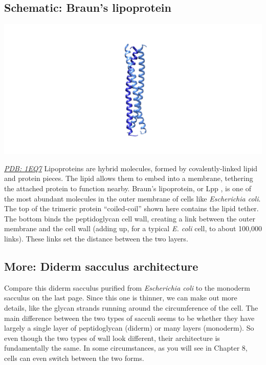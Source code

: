\documentclass[]{tufte-book}
\begin{document}
\hypertarget{Brauns_lipoprotein}{\subsection*{Schematic: Braun's
lipoprotein}\label{Brauns_lipoprotein}}

\includegraphics{img/schematics/2_3_1}

\href{http://rcsb.org/structure/1EQ7}{\emph{PDB: 1EQ7}} Lipoproteins are
hybrid molecules, formed by covalently-linked lipid and protein pieces.
The lipid allows them to embed into a membrane, tethering the attached
protein to function nearby. Braun's lipoprotein, or Lpp \citep{shu2000},
is one of the most abundant molecules in the outer membrane of cells
like \emph{Escherichia coli}. The top of the trimeric protein
``coiled-coil'' shown here contains the lipid tether. The bottom binds
the peptidoglycan cell wall, creating a link between the outer membrane
and the cell wall (adding up, for a typical \emph{E. coli} cell, to
about 100,000 links). These links set the distance between the two
layers.

\hypertarget{Diderm_sacculus_architecture}{\subsection*{More: Diderm
sacculus architecture}\label{Diderm_sacculus_architecture}}

Compare this diderm sacculus purified from \emph{Escherichia coli} to
the monoderm sacculus on the last page. Since this one is thinner, we
can make out more details, like the glycan strands running around the
circumference of the cell. The main difference between the two types of
sacculi seems to be whether they have largely a single layer of
peptidoglycan (diderm) or many layers (monoderm). So even though the two
types of wall look different, their architecture is fundamentally the
same. In some circumstances, as you will see in Chapter 8, cells can
even switch between the two forms.
\end{document}
